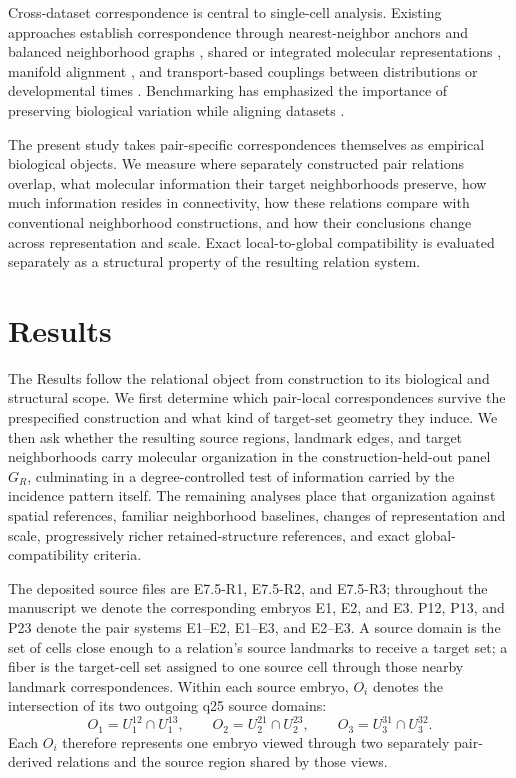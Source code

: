 \documentclass[11pt]{article}
\begin{document}
Cross-dataset correspondence is central to single-cell analysis. Existing approaches establish correspondence through nearest-neighbor anchors and balanced neighborhood graphs \cite{Haghverdi2018,Stuart2019,Polanski2020}, shared or integrated molecular representations \cite{Hie2019,Korsunsky2019,Lopez2018,Welch2019}, manifold alignment \cite{Welch2017}, and transport-based couplings between distributions or developmental times \cite{Schiebinger2019}. Benchmarking has emphasized the importance of preserving biological variation while aligning datasets \cite{Luecken2022}.

The present study takes pair-specific correspondences themselves as empirical biological objects. We measure where separately constructed pair relations overlap, what molecular information their target neighborhoods preserve, how much information resides in connectivity, how these relations compare with conventional neighborhood constructions, and how their conclusions change across representation and scale. Exact local-to-global compatibility is evaluated separately as a structural property of the resulting relation system.

\FloatBarrier
\section{Results}

The Results follow the relational object from construction to its biological and structural scope. We first determine which pair-local correspondences survive the prespecified construction and what kind of target-set geometry they induce. We then ask whether the resulting source regions, landmark edges, and target neighborhoods carry molecular organization in the construction-held-out panel \(G_R\), culminating in a degree-controlled test of information carried by the incidence pattern itself. The remaining analyses place that organization against spatial references, familiar neighborhood baselines, changes of representation and scale, progressively richer retained-structure references, and exact global-compatibility criteria.

The deposited source files are E7.5-R1, E7.5-R2, and E7.5-R3; throughout the manuscript we denote the corresponding embryos E1, E2, and E3. P12, P13, and P23 denote the pair systems E1--E2, E1--E3, and E2--E3. A source domain is the set of cells close enough to a relation's source landmarks to receive a target set; a fiber is the target-cell set assigned to one source cell through those nearby landmark correspondences. Within each source embryo, \(O_i\) denotes the intersection of its two outgoing q25 source domains:
\[
O_1=U_1^{12}\cap U_1^{13},\qquad
O_2=U_2^{21}\cap U_2^{23},\qquad
O_3=U_3^{31}\cap U_3^{32}.
\]
Each \(O_i\) therefore represents one embryo viewed through two separately pair-derived relations and the source region shared by those views.
\end{document}
